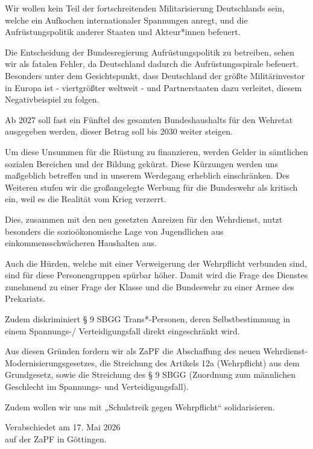 \documentclass[DIV=calc]{scrartcl}
\begin{document}
Wir wollen kein Teil der fortschreitenden Militarisierung Deutschlands sein, welche ein Aufkochen 
internationaler Spannungen anregt, und die Aufrüstungspolitik anderer Staaten und Akteur*innen befeuert.

Die Entscheidung der Bundesregierung Aufrüstungspolitik zu betreiben, sehen wir als fatalen Fehler, da 
Deutschland dadurch die Aufrüstungsspirale befeuert. Besonders unter dem Gesichtspunkt, dass 
Deutschland der größte Militärinvestor in Europa ist - viertgrößter weltweit - und Partnerstaaten dazu 
verleitet, diesem Negativbeispiel zu folgen.

Ab 2027 soll fast ein Fünftel des gesamten Bundeshaushalts für den Wehretat ausgegeben werden, dieser 
Betrag soll bis 2030 weiter steigen.

Um diese Unsummen für die Rüstung zu finanzieren, werden Gelder in sämtlichen sozialen Bereichen und 
der Bildung gekürzt. Diese Kürzungen werden uns maßgeblich betreffen und in unserem Werdegang 
erheblich einschränken.
Des Weiteren stufen wir die großangelegte Werbung für die Bundeswehr als kritisch ein, weil es die 
Realität vom Krieg verzerrt.

Dies, zusammen mit den neu gesetzten Anreizen für den Wehrdienst, nutzt besonders die 
sozioökonomische Lage von Jugendlichen aus einkommensschwächeren Haushalten aus.

Auch die Hürden, welche mit einer Verweigerung der Wehrpflicht verbunden sind, sind für diese Personengruppen spürbar höher. Damit wird die Frage des Dienstes zunehmend zu einer Frage der Klasse und die Bundeswehr zu einer Armee des Prekariats.

Zudem diskriminiert § 9 SBGG Trans*-Personen, deren Selbstbestimmung in einem Spannungs-/
Verteidigungsfall direkt eingeschränkt wird.

Aus diesen Gründen fordern wir als ZaPF die Abschaffung des neuen Wehrdienst-Modernisierungsgesetzes, die Streichung des Artikels 12a (Wehrpflicht) aus dem Grundgesetz, sowie die 
Streichung des § 9 SBGG (Zuordnung zum männlichen Geschlecht im Spannungs- und Verteidigungsfall).

Zudem wollen wir uns mit „Schulstreik gegen Wehrpflicht“ solidarisieren. 


\vspace{1cm} 
%
\vfill
\begin{flushright}
	Verabschiedet am 17. Mai 2026 \\
	auf der ZaPF in Göttingen.
\end{flushright}
\end{document}
